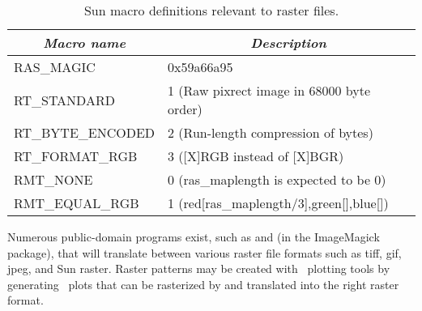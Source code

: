 \begin{table}[H]
\centering
\begin{tabular}{|l|l|}  \hline

\multicolumn{1}{|c}{\emph{Macro name}}  &       \multicolumn{1}{|c|}{\emph{Description}}        \\ \hline
RAS\_MAGIC      &       0x59a66a95  \\ \hline
RT\_STANDARD    &       1 (Raw pixrect image in 68000 byte order)  \\ \hline
RT\_BYTE\_ENCODED       &       2 (Run-length compression of bytes)  \\ \hline
RT\_FORMAT\_RGB &       3 ([X]RGB instead of [X]BGR)  \\ \hline
RMT\_NONE       &       0 (ras\_maplength is expected to be 0)  \\ \hline
RMT\_EQUAL\_RGB &       1 (red[ras\_maplength/3],green[],blue[])  \\ \hline

\end{tabular}

\caption{Sun macro definitions relevant to raster files.}
\label{tbl:sundef}
\end{table} 

Numerous public-domain programs exist, such as  and
 (in the ImageMagick package), that will translate
between various raster file formats such as tiff, gif, jpeg, and
Sun raster.  Raster patterns may be created with \GMT\ plotting
tools by generating \PS\ plots that can be rasterized
by  and translated into the right raster format.
